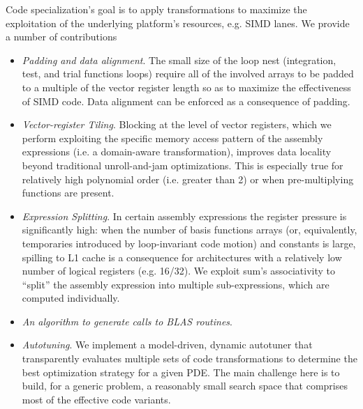 Code specialization's goal is to apply transformations to maximize the exploitation of the underlying platform's resources, e.g. SIMD lanes. We provide a number of contributions
\begin{itemize}
\item \emph{Padding and data alignment}. The small size of the loop nest (integration, test, and trial functions loops) require all of the involved arrays to be padded to a multiple of the vector register length so as to maximize the effectiveness of SIMD code. Data alignment can be enforced as a consequence of padding. 
\item \emph{Vector-register Tiling}. Blocking at the level of vector registers, which we perform exploiting the specific memory access pattern of the assembly expressions (i.e. a domain-aware transformation), improves data locality beyond traditional unroll-and-jam optimizations. This is especially true for relatively high polynomial order (i.e. greater than 2) or when pre-multiplying functions are present.
\item \emph{Expression Splitting}. In certain assembly expressions the register pressure is significantly high: when the number of basis functions arrays (or, equivalently, temporaries introduced by loop-invariant code motion) and constants is large, spilling to L1 cache is a consequence for architectures with a relatively low number of logical registers (e.g. 16/32). We exploit sum's associativity to ``split'' the assembly expression into multiple sub-expressions, which are computed individually.
\item \emph{An algorithm to generate calls to BLAS routines}.
\item \emph{Autotuning}. We implement a model-driven, dynamic autotuner that transparently evaluates multiple sets of code transformations to determine the best optimization strategy for a given PDE. The main challenge here is to build, for a generic problem, a reasonably small search space that comprises most of the effective code variants.
\end{itemize} 

